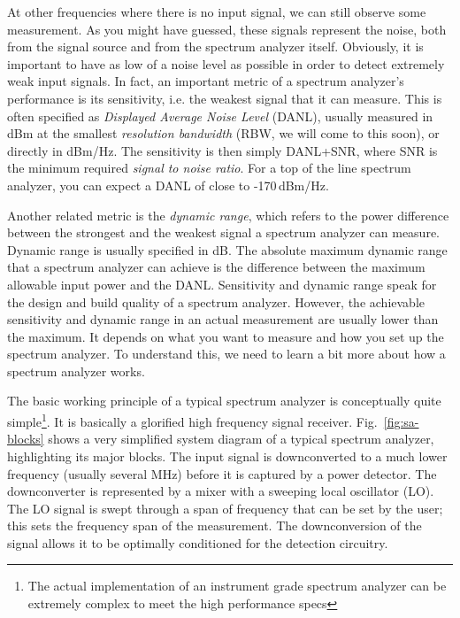 \documentclass[letterpaper, 11pt]{article}
\begin{document}
At other frequencies where there is no input signal, we can still observe some measurement. As you might have guessed, these signals represent the noise, both from the signal source and from the spectrum analyzer itself. Obviously, it is important to have as low of a noise level as possible in order to detect extremely weak input signals. In fact, an important metric of a spectrum analyzer's performance is its sensitivity, i.e. the weakest signal that it can measure. This is often specified as \textit{Displayed Average Noise Level} (DANL), usually measured in dBm at the smallest \textit{resolution bandwidth} (RBW, we will come to this soon), or directly in dBm/Hz. The sensitivity is then simply DANL+SNR, where SNR is the minimum required \textit{signal to noise ratio}. For a top of the line spectrum analyzer, you can expect a DANL of close to -170\,dBm/Hz.

Another related metric is the \textit{dynamic range}, which refers to the power difference between the strongest and the weakest signal a spectrum analyzer can measure. Dynamic range is usually specified in dB. The absolute maximum dynamic range that a spectrum analyzer can achieve is the difference between the maximum allowable input power and the DANL. 
Sensitivity and dynamic range speak for the design and build quality of a spectrum analyzer. However, the achievable sensitivity and dynamic range in an actual measurement are usually lower than the maximum. It depends on what you want to measure and how you set up the spectrum analyzer. To understand this, we need to learn a bit more about how a spectrum analyzer works. 

The basic working principle of a typical spectrum analyzer is conceptually quite simple\footnote{The actual implementation of an instrument grade spectrum analyzer can be extremely complex to meet the high performance specs}. It is basically a glorified high frequency signal receiver. Fig.~\ref{fig:sa-blocks} shows a very simplified system diagram of a typical spectrum analyzer, highlighting its major blocks. The input signal is downconverted to a much lower frequency (usually several MHz) before it is captured by a power detector. The downconverter is represented by a mixer with a sweeping local oscillator (LO). The LO signal is swept through a span of frequency that can be set by the user; this sets the frequency span of the measurement. The downconversion of the signal allows it to be optimally conditioned for the detection circuitry. 
\end{document}
